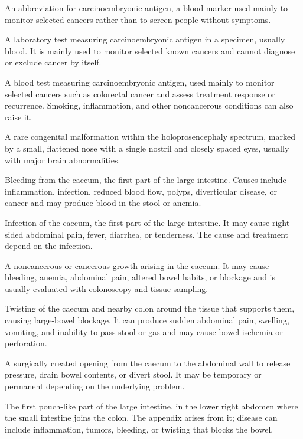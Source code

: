  An abbreviation for carcinoembryonic antigen, a blood marker used mainly to monitor selected cancers rather than to screen people without symptoms.

 A laboratory test measuring carcinoembryonic antigen in a specimen, usually blood. It is mainly used to monitor selected known cancers and cannot diagnose or exclude cancer by itself.

 A blood test measuring carcinoembryonic antigen, used mainly to monitor selected cancers such as colorectal cancer and assess treatment response or recurrence. Smoking, inflammation, and other noncancerous conditions can also raise it.

 A rare congenital malformation within the holoprosencephaly spectrum, marked by a small, flattened nose with a single nostril and closely spaced eyes, usually with major brain abnormalities.

 Bleeding from the caecum, the first part of the large intestine. Causes include inflammation, infection, reduced blood flow, polyps, diverticular disease, or cancer and may produce blood in the stool or anemia.

 Infection of the caecum, the first part of the
large intestine. It may cause right-sided abdominal pain, fever, diarrhea,
or tenderness. The cause and treatment depend on the infection.


 A noncancerous or cancerous growth arising in the caecum. It may cause bleeding, anemia, abdominal pain, altered bowel habits, or blockage and is usually evaluated with colonoscopy and tissue sampling.

 Twisting of the caecum and nearby colon around the tissue that supports them, causing large-bowel blockage. It can produce sudden abdominal pain, swelling, vomiting, and inability to pass stool or gas and may cause bowel ischemia or perforation.

 A surgically created opening from the caecum to the abdominal wall to release pressure, drain bowel contents, or divert stool. It may be temporary or permanent depending on the underlying problem.

 The first pouch-like part of the large intestine, in the lower right abdomen where the small intestine joins the colon. The appendix arises from it; disease can include inflammation, tumors, bleeding, or twisting that blocks the bowel.

